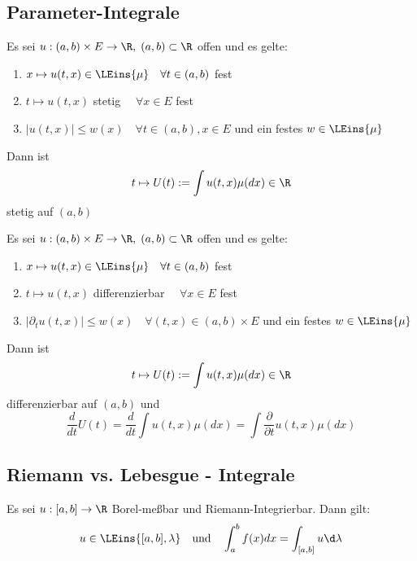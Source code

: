 \documentclass[11pt, a4paper]{article}
\begin{document}
\newpage
\subsection{Parameter-Integrale}
\begin{lemma} 
    Es sei $u:(a,b)\times E \to \R, \; (a,b)\subset \R $ offen und es gelte:
    \begin{enumerate}
        \item $x\mapsto u(t,x) \in \LEins{\mu} \quad \forall t\in (a,b)$ fest
        \item $t\mapsto u(t,x)$ stetig $\quad \forall x\in E$ fest
        \item $|u(t,x)| \leqslant w(x) \quad \forall t\in(a,b), x\in E$ und ein festes $w\in \LEins{\mu}$
    \end{enumerate}
    Dann ist $$t\mapsto U(t) := \int u(t,x) \mu(dx) \in \R$$ stetig auf $(a,b)$
\end{lemma}

\begin{lemma}
        Es sei $u:(a,b)\times E \to \R, \; (a,b)\subset \R $ offen und es gelte:
    \begin{enumerate}
        \item $x\mapsto u(t,x) \in \LEins{\mu} \quad \forall t\in (a,b)$ fest
        \item $t\mapsto u(t,x)$ differenzierbar $\quad \forall x\in E$ fest
        \item $|\partial_t u(t,x)| \leqslant w(x) \quad \forall (t,x)\in (a,b)\times E$ und ein festes $w\in \LEins{\mu}$
    \end{enumerate}
    Dann ist $$t\mapsto U(t) := \int u(t,x) \mu(dx) \in \R$$ differenzierbar auf $(a,b)$ und 
    $$\frac{d}{dt}U(t) = \frac{d}{dt}\int u(t,x) \mu(dx) = \int \frac{\partial}{\partial t}u(t,x)\mu(dx)$$
\end{lemma}




 
\subsection{Riemann vs. Lebesgue - Integrale}
\begin{theorem}
Es sei $u:[a,b] \to \R $ Borel-meßbar und Riemann-Integrierbar. Dann gilt:
$$u\in \LEins{[a,b],\lambda} \quad \text{und} \quad \int_a^b f(x)dx = \int_{[a,b]} u\d\lambda$$
\end{theorem}
\end{document}
